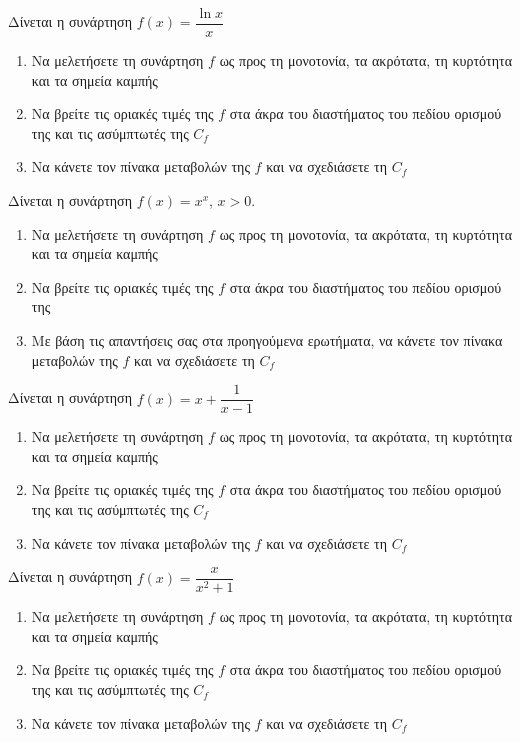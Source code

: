 \documentclass{../presentation}
\begin{document}
\begin{askisi}
  Δίνεται η συνάρτηση $f(x)=\dfrac{\ln x}{x}$
  \begin{enumerate}[<+->]
    \item Να μελετήσετε τη συνάρτηση $f$ ως προς τη μονοτονία, τα ακρότατα, τη κυρτότητα και τα σημεία καμπής
    \item Να βρείτε τις οριακές τιμές της $f$ στα άκρα του διαστήματος του πεδίου ορισμού της και τις ασύμπτωτές της $C_f$
    \item Να κάνετε τον πίνακα μεταβολών της $f$ και να σχεδιάσετε τη $C_f$
  \end{enumerate}
\end{askisi}

\begin{askisi}
  Δίνεται η συνάρτηση $f(x)=x^x$, $x>0$.
  \begin{enumerate}
    \item Να μελετήσετε τη συνάρτηση $f$ ως προς τη μονοτονία, τα ακρότατα, τη κυρτότητα και τα σημεία καμπής
    \item Να βρείτε τις οριακές τιμές της $f$ στα άκρα του διαστήματος του πεδίου ορισμού της
    \item Με βάση τις απαντήσεις σας στα προηγούμενα ερωτήματα, να κάνετε τον πίνακα μεταβολών της $f$ και να σχεδιάσετε τη $C_f$
  \end{enumerate}
\end{askisi}

\begin{askisi}
  Δίνεται η συνάρτηση $f(x)=x+\dfrac{1}{x-1}$
  \begin{enumerate}[<+->]
    \item Να μελετήσετε τη συνάρτηση $f$ ως προς τη μονοτονία, τα ακρότατα, τη κυρτότητα και τα σημεία καμπής
    \item Να βρείτε τις οριακές τιμές της $f$ στα άκρα του διαστήματος του πεδίου ορισμού της και τις ασύμπτωτές της $C_f$
    \item Να κάνετε τον πίνακα μεταβολών της $f$ και να σχεδιάσετε τη $C_f$
  \end{enumerate}
\end{askisi}

\begin{askisi}
  Δίνεται η συνάρτηση $f(x)=\dfrac{x}{x^2+1}$
  \begin{enumerate}[<+->]
    \item Να μελετήσετε τη συνάρτηση $f$ ως προς τη μονοτονία, τα ακρότατα, τη κυρτότητα και τα σημεία καμπής
    \item Να βρείτε τις οριακές τιμές της $f$ στα άκρα του διαστήματος του πεδίου ορισμού της και τις ασύμπτωτές της $C_f$
    \item Να κάνετε τον πίνακα μεταβολών της $f$ και να σχεδιάσετε τη $C_f$
  \end{enumerate}
\end{askisi}
\end{document}
